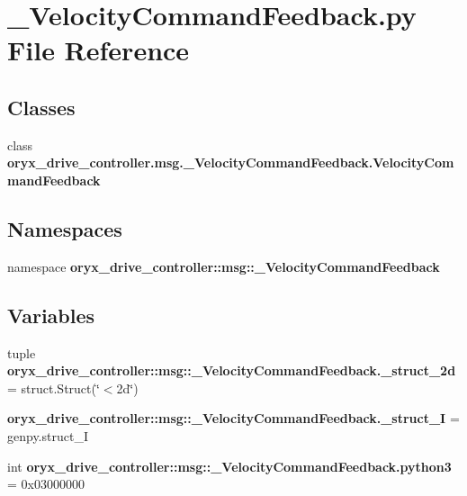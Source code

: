 \section{\-\_\-\-Velocity\-Command\-Feedback.\-py \-File \-Reference}
\label{__VelocityCommandFeedback_8py}
\subsection*{\-Classes}
\begin{DoxyCompactItemize}
\item 
class {\bf oryx\-\_\-drive\-\_\-controller.\-msg.\-\_\-\-Velocity\-Command\-Feedback.\-Velocity\-Command\-Feedback}
\end{DoxyCompactItemize}
\subsection*{\-Namespaces}
\begin{DoxyCompactItemize}
\item 
namespace {\bf oryx\-\_\-drive\-\_\-controller\-::msg\-::\-\_\-\-Velocity\-Command\-Feedback}
\end{DoxyCompactItemize}
\subsection*{\-Variables}
\begin{DoxyCompactItemize}
\item 
tuple {\bf oryx\-\_\-drive\-\_\-controller\-::msg\-::\-\_\-\-Velocity\-Command\-Feedback.\-\_\-struct\-\_\-2d} = struct.\-Struct(\char`\"{}$<$2d\char`\"{})
\item 
{\bf oryx\-\_\-drive\-\_\-controller\-::msg\-::\-\_\-\-Velocity\-Command\-Feedback.\-\_\-struct\-\_\-\-I} = genpy.\-struct\-\_\-\-I
\item 
int {\bf oryx\-\_\-drive\-\_\-controller\-::msg\-::\-\_\-\-Velocity\-Command\-Feedback.\-python3} = 0x03000000
\end{DoxyCompactItemize}
